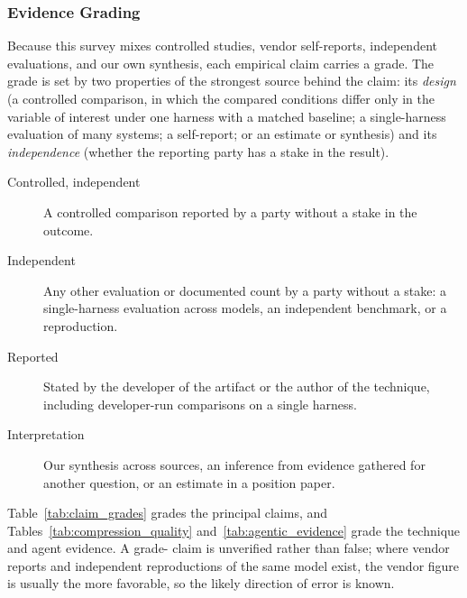 \subsubsection{Evidence Grading}
\label{subsec:reported_grading}

Because this survey mixes controlled studies, vendor self-reports, independent evaluations, and our own synthesis, each empirical claim carries a grade. The grade is set by two properties of the strongest source behind the claim: its \emph{design} (a controlled comparison, in which the compared conditions differ only in the variable of interest under one harness with a matched baseline; a single-harness evaluation of many systems; a self-report; or an estimate or synthesis) and its \emph{independence} (whether the reporting party has a stake in the result).

\begin{description}
  \item[\evA{} Controlled, independent] A controlled comparison reported by a party without a stake in the outcome.
  \item[\evB{} Independent] Any other evaluation or documented count by a party without a stake: a single-harness evaluation across models, an independent benchmark, or a reproduction.
  \item[\evC{} Reported] Stated by the developer of the artifact or the author of the technique, including developer-run comparisons on a single harness.
  \item[\evD{} Interpretation] Our synthesis across sources, an inference from evidence gathered for another question, or an estimate in a position paper.
\end{description}

Table~\ref{tab:claim_grades} grades the principal claims, and Tables~\ref{tab:compression_quality} and~\ref{tab:agentic_evidence} grade the technique and agent evidence. A grade-\evC{} claim is unverified rather than false; where vendor reports and independent reproductions of the same model exist, the vendor figure is usually the more favorable, so the likely direction of error is known.

